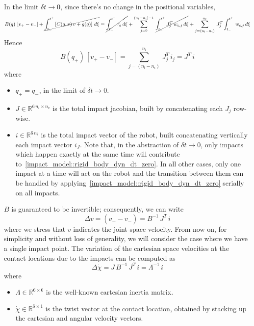 \documentclass[letterpaper, 10 pt, conference]{ieeeconf}  %
\begin{document}
In the limit $\delta t \rightarrow 0$, since there's no change in the positional variables, 
\begin{dmath}
B(q)\,\left[v_{+} - v_{-}\right] + \cancel{\int_{t_{-}}^{t^{+}}\left[C(q, v)\,v + g(q)\right]\,d\xi} =  \cancel{\int_{t_{-}}^{t^{+}}\tau_{a}\,d\xi}+ \sum_{j = 0}^{\left(n_l - n_i\right) - 1}\, \cancel{\int_{t_{-}}^{t^{+}}J^{T}_{j}\,w_{c, j}\,d\xi} + \sum_{j = \left(n_l - n_i\right)}^{n_l}\,J^{T}_{j}\int_{t_{-}}^{t^{+}}\,w_{c, j}\,d\xi
\end{dmath}
Hence
\begin{dmath}\label{impact_model::rigid_body_dyn_dt_zero}
B(q_{+})\,\left[v_{+} - v_{-}\right] = \sum_{j = \left(n_l - n_i\right)}^{n_l}\,J^{T}_{j}\,i_j = J^T\,i
\end{dmath}
where 
\begin{itemize}
\item $q_{+} = q_{-}$, in the limit of $\delta t \rightarrow 0$.
\item $J\in\mathbb{R}^{6\,n_i\times n_v}$ is the total impact jacobian, built by concatenating each $J_j$ row-wise.
\item $i\in\mathbb{R}^{6\,n_i}$ is the total impact vector of the robot, built concatenating vertically each impact vector $i_J$. Note that, in the abstraction of $\delta t \rightarrow 0$, only impacts which happen exactly at the same time will contribute to~\eqref{impact_model::rigid_body_dyn_dt_zero}. In all other cases, only one impact at a time will act on the robot and the transition between them can be handled by applying~\eqref{impact_model::rigid_body_dyn_dt_zero} serially on all impacts.
\end{itemize}
$B$ is guaranteed to be invertible; consequently, we can write
\begin{equation}\label{impact_model::delta_v}
\Delta v = \left(v_{+} - v_{-}\right) = B^{-1}\,J^T\,i
\end{equation}
where we stress that $v$ indicates the joint-space velocity. From now on, for simplicity and without loss of generality, we will consider the case where we have a single impact point.
The variation of the cartesian space velocities at the contact locations due to the impacts can be computed as
\begin{equation}\label{impact_model::delta_chi}
\Delta\dot{\chi} = J\, B^{-1}\,J^T\,i = \Lambda^{-1}\,i
\end{equation}
where
\begin{itemize}
\item $\Lambda\in\mathbb{R}^{6\times6}$ is the well-known cartesian inertia matrix.
\item $\dot{\chi}\in\mathbb{R}^{6\times1}$ is the twist vector at the contact location, obtained by stacking up the cartesian and angular velocity vectors.
\end{itemize}
\end{document}
